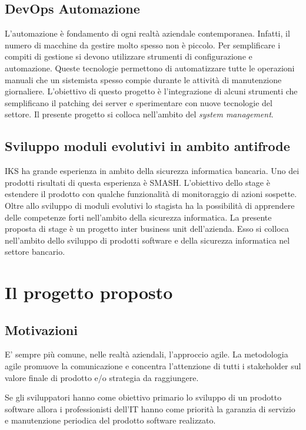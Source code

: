 \subsection{DevOps Automazione}
L'automazione è fondamento di ogni realtà aziendale contemporanea. Infatti, 
il numero di macchine da gestire molto spesso non è piccolo. Per semplificare i 
compiti di gestione si devono utilizzare strumenti di configurazione e 
automazione. Queste tecnologie permettono di automatizzare tutte le operazioni 
manuali che un sistemista spesso compie durante le attività di manutenzione 
giornaliere. L'obiettivo di questo progetto è l'integrazione di alcuni 
strumenti che semplificano il \gls{patching} dei server e sperimentare con 
nuove tecnologie del settore.
Il presente progetto si colloca nell'ambito del \textit{system management}. 

\subsection{Sviluppo moduli evolutivi in ambito antifrode}
IKS ha grande esperienza in ambito della sicurezza informatica bancaria. Uno 
dei prodotti risultati di questa esperienza è SMASH. L'obiettivo dello stage è 
estendere il prodotto con qualche funzionalità di monitoraggio di azioni 
sospette. Oltre allo sviluppo di moduli evolutivi lo stagista ha la possibilità 
di apprendere delle competenze forti nell'ambito della 
sicurezza informatica. 
La presente proposta di stage è un progetto inter business unit dell'azienda. 
Esso si colloca nell'ambito dello sviluppo di prodotti software e della 
sicurezza informatica nel settore bancario.


\section{Il progetto proposto}
\subsection{Motivazioni}

E' sempre più comune, nelle realtà aziendali, l'approccio agile. 
La metodologia agile promuove la comunicazione e concentra l'attenzione 
di tutti i stakeholder sul valore finale di prodotto e/o strategia da raggiungere. 

Se gli sviluppatori hanno come obiettivo primario lo sviluppo di un prodotto 
software allora i professionisti dell'IT hanno come priorità la garanzia di 
servizio e manutenzione periodica del prodotto software realizzato. 

